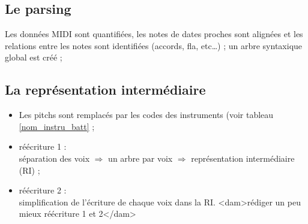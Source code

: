 %
%
%
%
%

\subsection*{Le parsing}
Les données MIDI sont quantifiées, les notes de dates proches sont alignées et
les relations entre les notes sont identifiées (accords, fla, etc…) ; un arbre
syntaxique global est créé ;

\subsection*{La représentation intermédiaire}
\label{regles}
\begin{itemize}
    \item Les pitchs sont remplacés par les codes des instruments (voir tableau
    \ref{nom_instru_batt} ;
    \item réécriture 1 :\\
    séparation des voix $\Rightarrow$ un arbre par voix
    $\Rightarrow$ représentation intermédiaire (RI) ;
    \item réécriture 2 :\\
    simplification de l’écriture de chaque voix dans la RI.
    <dam>rédiger un peu mieux réécriture 1 et 2</dam>
\end{itemize}

